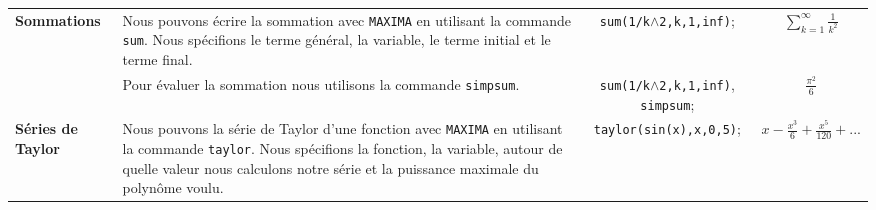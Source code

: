 \documentclass[8pt,landscape]{article}
\begin{document}
\begin{center}
\begin{longtable}{p{4cm}p{10cm}cc}
\midrule

\multirow{2}{4cm}{\textbf{Sommations}} & Nous pouvons écrire la sommation avec \texttt{MAXIMA} en utilisant la commande \texttt{sum}. Nous spécifions le terme général, la variable, le terme initial et le terme final. & \texttt{sum(1/k$\wedge$2,k,1,inf)}; & $\sum\limits_{k=1}^{\infty} \frac{1}{k^2}$ \\
\cmidrule{2-4}
& Pour évaluer la sommation nous utilisons la commande \texttt{simpsum}. & \texttt{sum(1/k$\wedge$2,k,1,inf)}, \texttt{simpsum}; & $\frac{\pi^2}{6}$ \\

\midrule

\textbf{Séries de Taylor} & Nous pouvons la série de Taylor d'une fonction avec \texttt{MAXIMA} en utilisant la commande \texttt{taylor}. Nous spécifions la fonction, la variable, autour de quelle valeur nous calculons notre série et la puissance maximale du polynôme voulu. & \texttt{taylor(sin(x),x,0,5)}; & $x-\frac{{{x}^{3}}}{6}+\frac{{{x}^{5}}}{120}+\mbox{...}$ \\

\bottomrule
\end{longtable}
\end{center}
\end{document}
